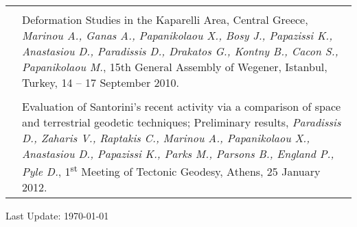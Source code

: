 \documentclass[9pt]{extarticle} %
\begin{document}
\begin{longtable}{r|p{14cm}}
  &\\

  & Deformation Studies in the Kaparelli Area, Central Greece,
  \emph{Marinou A., Ganas A., Papanikolaou X., Bosy J., Papazissi K., Anastasiou D., Paradissis D., Drakatos G., Kontny B., Cacon S., Papanikolaou M.},
  15th General Assembly of Wegener, Istanbul, Turkey, 14 – 17 September 2010.\\

  &\\

  & Evaluation of Santorini's recent activity via a comparison of space and terrestrial geodetic techniques; Preliminary results,
  \emph{Paradissis D., Zaharis V., Raptakis C., Marinou A., Papanikolaou X., Anastasiou D., Papazissi K., Parks M., Parsons B., England P., Pyle D.},
  1\textsuperscript{st} Meeting of Tectonic Geodesy, Athens, 25 January 2012.\\

\end{longtable}



\vfill
\begin{center}
  \begin{footnotesize}
    Last Update: \today
  \end{footnotesize}
\end{center}
\end{document}
